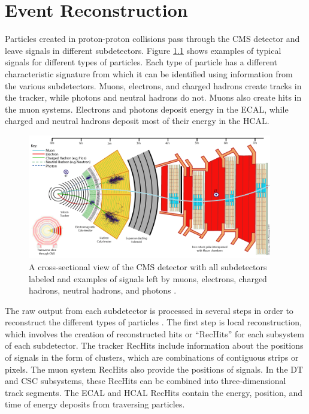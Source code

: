 \chapter{Event Reconstruction
\label{ch:reconstruction}}

Particles created in proton-proton collisions pass through the CMS detector and leave signals in different subdetectors. Figure \ref{fig:cms-slice} shows examples of typical signals for different types of particles. Each type of particle has a different characteristic signature from which it can be identified using information from the various subdetectors. Muons, electrons, and charged hadrons create tracks in the tracker, while photons and neutral hadrons do not. Muons also create hits in the muon systems. Electrons and photons deposit energy in the ECAL, while charged and neutral hadrons deposit most of their energy in the HCAL.

\begin{figure}[hbt]
\begin{center}
\includegraphics[width=0.95\textwidth]{figures/CMS_slice.png}
\caption{A cross-sectional view of the CMS detector with all subdetectors labeled and examples of signals left by muons, electrons, charged hadrons, neutral hadrons, and photons \cite{CMS-slice}.}
\label{fig:cms-slice}
\end{center}
\end{figure}

The raw output from each subdetector is processed in several steps in order to reconstruct the different types of particles \cite{TDR-software}. The first step is local reconstruction, which involves the creation of reconstructed hits or ``RecHits'' for each subsystem of each subdetector. The tracker RecHits include information about the positions of signals in the form of clusters, which are combinations of contiguous strips or pixels. The muon system RecHits also provide the positions of signals. In the DT and CSC subsystems, these RecHits can be combined into three-dimensional track segments. The ECAL and HCAL RecHits contain the energy, position, and time of energy deposits from traversing particles.

